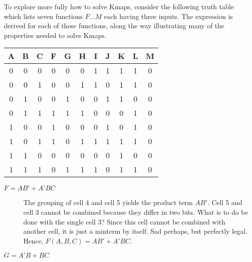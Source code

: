 \marginparsep=-1cm
\begin{changemargin}{1.5cm}{1.5cm}

To explore more fully how to solve Kmaps, consider the
following truth table which lists seven functions $F \ldots M$
each having three inputs.  The \SOPmin expression is derived
for each of these functions, along the way
illustrating many of the properties needed to solve Kmaps.

\begin{tabular}{c|c|c||c|c|c|c|c|c|c|c}
A & B & C & F & G & H & I & J & K & L & M  \\ \hline
0 & 0 & 0 & 0 & 0 & 0 & 1 & 1 & 1 & 1 & 0  \\ \hline
0 & 0 & 1 & 0 & 0 & 1 & 1 & 0 & 1 & 1 & 0  \\ \hline
0 & 1 & 0 & 0 & 1 & 0 & 0 & 1 & 1 & 0 & 0  \\ \hline
0 & 1 & 1 & 1 & 1 & 1 & 0 & 0 & 0 & 1 & 0  \\ \hline
1 & 0 & 0 & 1 & 0 & 0 & 0 & 1 & 0 & 1 & 0  \\ \hline
1 & 0 & 1 & 1 & 0 & 1 & 1 & 1 & 1 & 1 & 0  \\ \hline
1 & 1 & 0 & 0 & 0 & 0 & 0 & 0 & 1 & 0 & 0  \\ \hline
1 & 1 & 1 & 0 & 1 & 1 & 1 & 0 & 1 & 1 & 0
\end{tabular}

\begin{description}
\item [$F= AB' + A'BC$]
    The grouping of cell 4 and cell 5 yields the product term $AB'$.
    Cell 5 and cell 3 cannot be combined because they differ in two bits.
    What is to do be done with the single cell 3?  Since this cell
    cannot be combined
    with another cell, it is just a minterm by itself.  Sad perhaps,
    but perfectly legal.  Hence, $F(A,B,C) = AB' + A'BC$.

\item [$G=A'B + BC$]


\end{description}
\end{changemargin}
